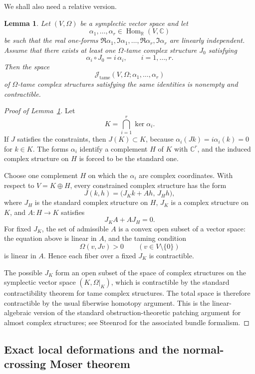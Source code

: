 \documentclass{amsart}
\newtheorem{lemma}{Lemma}
\theoremstyle{definition}
\newcommand{\C}{\mathbb C}
\newcommand{\R}{\mathbb R}
\newcommand{\Hom}{\operatorname{Hom}}
\begin{document}
We shall also need a relative version.

\begin{lemma}\label{lemma:contractible-relative}
Let $(V,\Omega)$ be a symplectic vector space and let
\[
\alpha_1,\dots,\alpha_r\in \Hom_\R(V,\C)
\]
be such that the real one-forms
$\Re\alpha_1,\Im\alpha_1,\dots,\Re\alpha_r,\Im\alpha_r$
are linearly independent. Assume that there exists at least one $\Omega$-tame complex
structure $J_0$ satisfying
\[
\alpha_i\circ J_0=i\,\alpha_i,\qquad i=1,\dots,r.
\]
Then the space
\[
\mathcal J_{\mathrm{tame}}(V,\Omega;\alpha_1,\dots,\alpha_r)
\]
of $\Omega$-tame complex structures satisfying the same identities is nonempty and
contractible.
\end{lemma}

\begin{proof}[Proof of Lemma~\ref{lemma:contractible-relative}]
Let
\[
K=\bigcap_{i=1}^r\ker \alpha_i .
\]
If $J$ satisfies the constraints, then $J(K)\subset K$, because
$\alpha_i(Jk)=i\alpha_i(k)=0$ for $k\in K$. The forms $\alpha_i$ identify a complement $H$ of
$K$ with $\C^r$, and the induced complex structure on $H$ is forced to be the standard one.

Choose one complement $H$ on which the $\alpha_i$ are complex coordinates. With respect to
$V=K\oplus H$, every constrained complex structure has the form
\[
J(k,h)=\bigl(J_K k+A h,\,J_H h\bigr),
\]
where $J_H$ is the standard complex structure on $H$, $J_K$ is a complex structure on $K$,
and $A:H\to K$ satisfies
\[
J_K A+A J_H=0 .
\]
For fixed $J_K$, the set of admissible $A$ is a convex open subset of a vector space: the
equation above is linear in $A$, and the taming condition
\[
\Omega(v,Jv)>0\qquad (v\in V\setminus\{0\})
\]
is linear in $A$. Hence each fiber over a fixed $J_K$ is contractible.

The possible $J_K$ form an open subset of the space of complex structures on the symplectic
vector space $(K,\Omega|_K)$, which is contractible by the standard contractibility theorem
for tame complex structures. The total space is therefore contractible by the usual
fiberwise homotopy argument. This is the linear-algebraic version of the standard
obstruction-theoretic patching argument for almost complex structures; see
Steenrod \cite{Steenrod} for the associated bundle formalism.
\end{proof}

\subsection{Exact local deformations and the normal-crossing Moser theorem}
\end{document}
